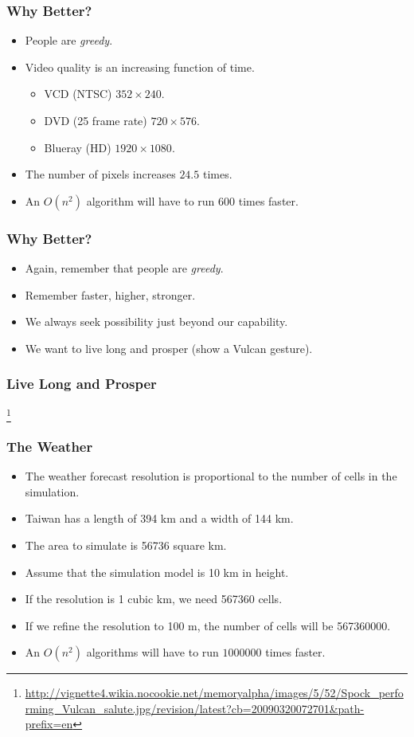 \documentclass{beamer}
\begin{document}
\begin{CJK}{UTF8}{bsmi}
\begin{frame}
\frametitle{Why Better?}
\begin{itemize}
\item People are {\em greedy}.
\item Video quality is an increasing function of time.
\begin{itemize}
\item VCD (NTSC) $352 \times 240$.
\item DVD (25 frame rate) $720 \times 576$.
\item Blueray (HD) $1920 \times 1080$.
\end{itemize}
\item The number of pixels increases $24.5$ times.
\item An $O(n^2)$ algorithm will have to run $600$ times faster.
\end{itemize}
\end{frame}

\begin{frame}
\frametitle{Why Better?}
\begin{itemize}
\item Again, remember that people are {\em greedy}.
\item Remember faster, higher, stronger.
\item We always seek possibility just beyond our capability.
\item We want to live long and prosper (show a Vulcan gesture).
\end{itemize}
\end{frame}

\begin{frame}
\frametitle{Live Long and Prosper}
\centerline{}
\footnote{\url{http://vignette4.wikia.nocookie.net/memoryalpha/images/5/52/Spock_performing_Vulcan_salute.jpg/revision/latest?cb=20090320072701&path-prefix=en}}
\end{frame}

\begin{frame}
\frametitle{The Weather}
\begin{itemize}
\item The weather forecast resolution is proportional to the number of
  cells in the simulation.
\item Taiwan has a length of 394 km and a width of 144 km.
\item The area to simulate is 56736 square km. 
\item Assume that the simulation model is 10 km in height.
\item If the resolution is 1 cubic km, we need 567360 cells.
\item If we refine the resolution to 100 m, the number of cells will be
  567360000.
\item An $O(n^2)$ algorithms will have to run $1000000$ times faster.
\end{itemize}
\end{frame}


\end{CJK}
\end{document}
